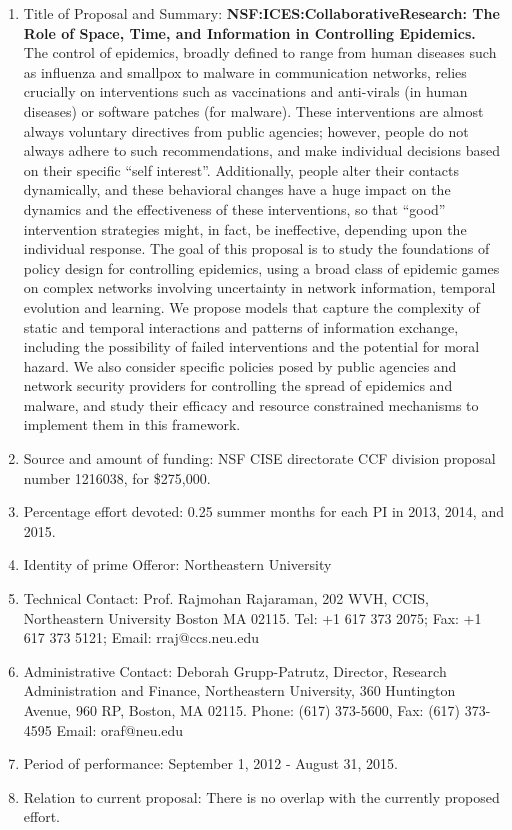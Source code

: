 \newpage
{}
\begin{enumerate}
\item Title of Proposal and Summary: {\bf
  NSF:ICES:CollaborativeResearch: The Role of Space, Time, and
  Information in Controlling Epidemics.} The control of epidemics,
  broadly defined to range from human diseases such as influenza and
  smallpox to malware in communication networks, relies crucially on
  interventions such as vaccinations and anti-virals (in human
  diseases) or software patches (for malware). These interventions are
  almost always voluntary directives from public agencies; however,
  people do not always adhere to such recommendations, and make
  individual decisions based on their specific “self interest”.
  Additionally, people alter their contacts dynamically, and these
  behavioral changes have a huge impact on the dynamics and the
  effectiveness of these interventions, so that “good” intervention
  strategies might, in fact, be ineffective, depending upon the
  individual response.  The goal of this proposal is to study the
  foundations of policy design for controlling epidemics, using a
  broad class of epidemic games on complex networks involving
  uncertainty in network information, temporal evolution and learning.
  We propose models that capture the complexity of static and temporal
  interactions and patterns of information exchange, including the
  possibility of failed interventions and the potential for moral
  hazard.  We also consider specific policies posed by public agencies
  and network security providers for controlling the spread of
  epidemics and malware, and study their efficacy and resource
  constrained mechanisms to implement them in this framework.
\item Source and amount of funding: NSF CISE directorate CCF division
  proposal number 1216038, for \$275,000.
\item Percentage effort devoted: 0.25 summer months for each PI in 2013, 2014, and 2015.
\item Identity of prime Offeror: Northeastern University
\item Technical Contact: Prof. Rajmohan Rajaraman,  202 WVH, CCIS, Northeastern University
Boston MA 02115.  Tel: +1 617 373 2075;  Fax: +1 617 373 5121;  Email: rraj@ccs.neu.edu
\item Administrative Contact: Deborah Grupp-Patrutz, Director,
  Research Administration and Finance, Northeastern University, 360
  Huntington Avenue, 960 RP, Boston, MA 02115. Phone: (617) 373-5600,
  Fax: (617) 373-4595 Email: oraf@neu.edu
\item  Period of performance: September 1, 2012 - August 31, 2015.
\item Relation to current proposal: There is no overlap with the currently proposed effort.
\end{enumerate}

